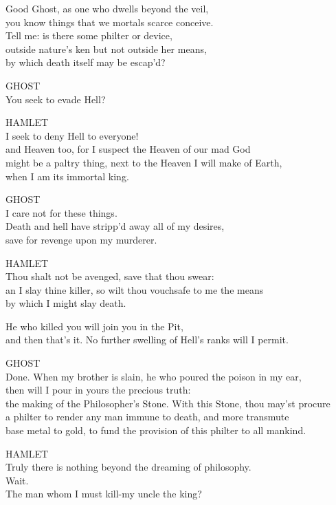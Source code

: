 \bigskip
\noindent{}Good Ghost, as one who dwells beyond the veil,\\
you know things that we mortals scarce conceive.\\
Tell me: is there some philter or device,\\
outside nature's ken but not outside her means,\\
by which death itself may be escap'd?

\bigskip
\noindent{}GHOST\\
You seek to evade Hell?

\bigskip
\noindent{}HAMLET\\
I seek to deny Hell to everyone!\\
and Heaven too, for I suspect the Heaven of our mad God\\
might be a paltry thing, next to the Heaven I will make of Earth,\\
when I am its immortal king.

\bigskip
\noindent{}GHOST\\
I care not for these things.\\
Death and hell have stripp'd away all of my desires,\\
save for revenge upon my murderer.

\bigskip
\noindent{}HAMLET\\
Thou shalt not be avenged, save that thou swear:\\
an I slay thine killer, so wilt thou vouchsafe to me the means\\
by which I might slay death.

\bigskip
\noindent{}He who killed you will join you in the Pit,\\
and then that's it. No further swelling of Hell's ranks will I permit.

\bigskip
\noindent{}GHOST\\
Done. When my brother is slain, he who poured the poison in my ear,\\
then will I pour in yours the precious truth:\\
the making of the Philosopher's Stone. With this Stone, thou may'st procure\\
a philter to render any man immune to death, and more transmute\\
base metal to gold, to fund the provision of this philter to all mankind.

\bigskip
\noindent{}HAMLET\\
Truly there is nothing beyond the dreaming of philosophy.\\
Wait.\\
The man whom I must kill-my uncle the king?

